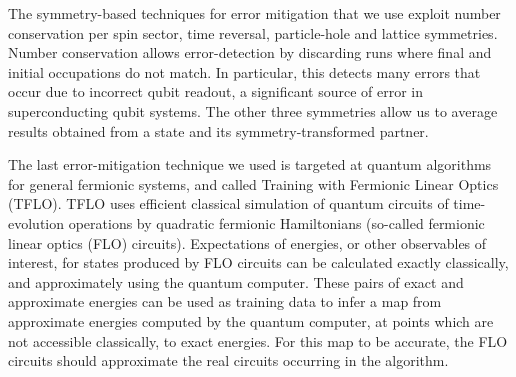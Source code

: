 \documentclass[aps,prb,twoside,superscriptaddress,longbibliography,nofootinbib,floatfix, notitlepage,twocolumn]{revtex4-1}
\begin{document}
The symmetry-based techniques for error mitigation that we use exploit number conservation per spin sector, time reversal, particle-hole and lattice symmetries. Number conservation allows error-detection by discarding runs where final and initial occupations do not match.  In particular, this detects many errors that occur due to incorrect qubit readout, a significant source of error in superconducting qubit systems. The other three symmetries allow us to average results obtained from a state and its symmetry-transformed partner.

The last error-mitigation technique we used is targeted at quantum algorithms for general fermionic systems\cite{montanaro21}, and called Training with Fermionic Linear Optics (TFLO). TFLO uses efficient classical simulation of quantum circuits of time-evolution operations by quadratic fermionic Hamiltonians\cite{terhal02} (so-called fermionic linear optics (FLO) circuits). Expectations of energies, or other observables of interest, for states produced by FLO circuits can be calculated exactly classically, and approximately using the quantum computer. These pairs of exact and approximate energies can be used as training data to infer a map from approximate energies computed by the quantum computer, at points which are not accessible classically, to exact energies. For this map to be accurate, the FLO circuits should approximate the real circuits occurring in the algorithm.
\end{document}
